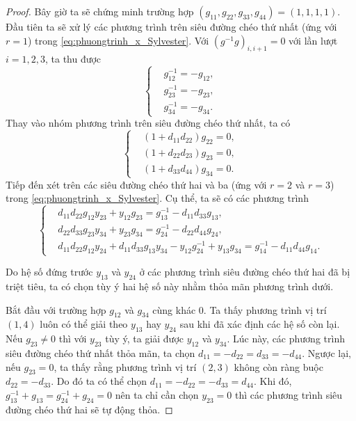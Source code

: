 \begin{proof}
Bây giờ ta sẽ chứng minh trường hợp \( (g_{11},g_{22},g_{33},g_{44}) = (1,1,1,1) \).
    Đầu tiên ta sẽ xử lý các phương trình trên siêu đường chéo thứ nhất (ứng với \( r = 1\)) trong \cref{eq:phuongtrinh_x_Sylvester}. Với \( (g^{-1}g)_{i,i+1} = 0 \) với lần lượt \( i = 1,2,3 \), ta thu được
    \[
    \left\{ \begin{aligned}
        & g^{-1}_{12} = -g_{12}, \\
        & g^{-1}_{23} = -g_{23}, \\
        & g^{-1}_{34} = -g_{34}.
    \end{aligned} \right.
    \]
    Thay vào nhóm phương trình trên siêu đường chéo thứ nhất, ta có
    \[
    \left\{ \begin{aligned}
        & (1 + d_{11} d_{22}) g_{22} = 0, \\
        & (1 + d_{22} d_{23}) g_{23} = 0, \\
        & (1 + d_{33} d_{44}) g_{34} = 0.
    \end{aligned} \right.
    \]
    Tiếp đến xét trên các siêu đường chéo thứ hai và ba (ứng với  \( r = 2 \) và \( r = 3 \)) trong \cref{eq:phuongtrinh_x_Sylvester}. Cụ thể, ta sẽ có các phương trình
    \[
    \left\{ \begin{aligned}
        & d_{11} d_{22} g_{12} y_{23} + y_{12} g_{23} = g^{-1}_{13} - d_{11} d_{33} g_{13}, \\
        & d_{22} d_{33} g_{23} y_{34} + y_{23} g_{34} = g^{-1}_{24} - d_{22} d_{44} g_{24}, \\
        & d_{11} d_{22} g_{12} y_{24} + d_{11} d_{33} g_{13} y_{34} - y_{12}g^{-1}_{24} + y_{13}g_{34} = g^{-1}_{14} - d_{11} d_{44} g_{14}.
    \end{aligned} \right.
    \]

    Do hệ số đứng trước $y_{13}$ và $y_{24}$ ở các phương trình siêu đường chéo thứ hai đã bị triệt tiêu, ta có chọn tùy ý hai hệ số này nhằm thỏa mãn phương trình dưới.
    
    Bắt đầu với trường hợp \( g_{12} \) và \( g_{34} \) cùng khác \( 0 \). Ta thấy phương trình vị trí \( (1,4) \) luôn có thể giải theo \( y_{13} \) hay \( y_{24} \) sau khi đã xác định các hệ số còn lại. Nếu \( g_{23} \neq 0 \) thì với \( y_{23} \) tùy ý, ta giải được \( y_{12} \) và \( y_{34} \). Lúc này, các  phương trình siêu đường chéo thứ nhất thỏa mãn, ta chọn \( d_{11} = -d_{22} = d_{33} = -d_{44} \). Ngược lại, nếu \( g_{23} = 0 \), ta thấy rằng phương trình vị trí \( (2,3) \) không còn ràng buộc \( d_{22} = -d_{33} \). Do đó ta có thể chọn \( d_{11} = -d_{22} = -d_{33} = d_{44} \). Khi đó, \( g^{-1}_{13} + g_{13} = g^{-1}_{24} + g_{24} = 0 \) nên ta chỉ cần chọn \( y_{23} = 0 \) thì các phương trình siêu đường chéo thứ hai sẽ tự động thỏa. 


\end{proof}
